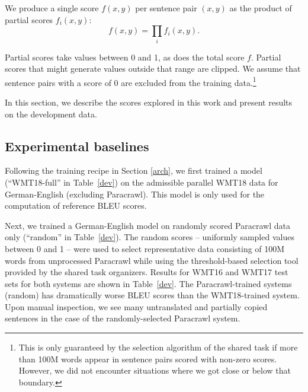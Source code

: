 \documentclass[11pt,a4paper]{article}
\begin{document}
We produce a single score $f(x,y)$ per sentence pair $(x,y)$ as the product of partial scores $f_i(x,y)$:
\begin{equation}
f(x,y) = \prod_{i} f_i(x,y).
\end{equation}

Partial scores take values between 0 and 1, as does the total score $f$. Partial scores that might generate values outside that range are clipped. We assume that sentence pairs with a score of 0 are excluded from the training data.\footnote{This is only guaranteed by the selection algorithm of the shared task if more than 100M words appear in sentence pairs scored with non-zero scores. However, we did not encounter situations where we got close or below that boundary.} 

In this section, we describe the scores explored in this work and present results on the development data.

\subsection{Experimental baselines}

Following the training recipe in Section \ref{arch}, we first trained a model (``WMT18-full'' in Table~\ref{dev}) on the admissible parallel WMT18 data for German-English (excluding Paracrawl). This model is only used for the computation of reference BLEU scores.

Next, we trained a German-English model on randomly scored Paracrawl data only (``random'' in Table~\ref{dev}). The random scores -- uniformly sampled values between 0 and 1 -- were used to select representative data consisting of 100M words from unprocessed Paracrawl while using the threshold-based selection tool provided by the shared task organizers. Results for WMT16 and WMT17 test sets for both systems are shown in Table~\ref{dev}. The Paracrawl-trained systems (random) has dramatically worse BLEU scores than the WMT18-trained system. Upon manual inspection, we see many untranslated and partially copied sentences in the case of the randomly-selected Paracrawl system. 
\end{document}
